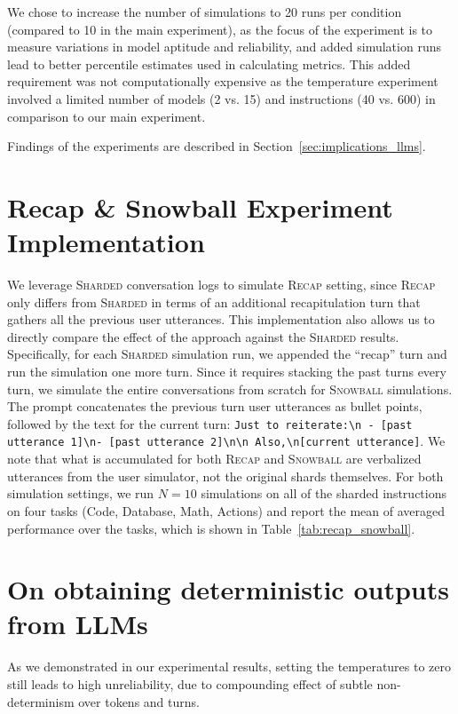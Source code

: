 \documentclass{article}
\newcommand{\shardedt}{\textsc{Sharded}\xspace}
\newcommand{\snowballt}{\textsc{Snowball}\xspace}
\newcommand{\recapt}{\textsc{Recap}\xspace}
\begin{document}
\begin{appendices}
We chose to increase the number of simulations to 20 runs per condition (compared to 10 in the main experiment), as the focus of the experiment is to measure variations in model aptitude and reliability, and added simulation runs lead to better percentile estimates used in calculating metrics. This added requirement was not computationally expensive as the temperature experiment involved a limited number of models (2 vs. 15) and instructions (40 vs. 600) in comparison to our main experiment.

Findings of the experiments are described in Section~\ref{sec:implications_llms}.

\section{Recap \& Snowball Experiment Implementation} \label{app:recap_snowball}
We leverage \shardedt conversation logs to simulate \recapt setting, since \recapt only differs from \shardedt in terms of an additional recapitulation turn that gathers all the previous user utterances.
This implementation also allows us to directly compare the effect of the approach against the \shardedt results.
Specifically, for each \shardedt simulation run, we appended the ``recap'' turn and run the simulation one more turn.
Since it requires stacking the past turns every turn, we simulate the entire conversations from scratch for \snowballt simulations.
The prompt concatenates the previous turn user utterances as bullet points, followed by the text for the current turn: \verb|Just to reiterate:\n - [past utterance 1]\n- [past utterance 2]\n\n Also,\n[current utterance]|.
We note that what is accumulated for both \recapt and \snowballt are verbalized utterances from the user simulator, not the original shards themselves.
For both simulation settings, we run $N=10$ simulations on all of the sharded instructions on four tasks (Code, Database, Math, Actions) and report the mean of averaged performance over the tasks, which is shown in Table~\ref{tab:recap_snowball}.

\section{On obtaining deterministic outputs from LLMs} \label{app:randomness}

As we demonstrated in our experimental results, setting the temperatures to zero still leads to high unreliability, due to compounding effect of subtle non-determinism over tokens and turns.


\end{appendices}
\end{document}
